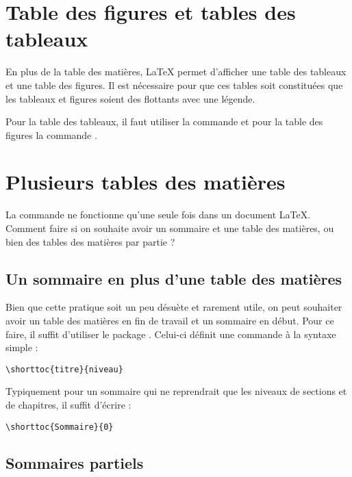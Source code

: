 \section{Table des figures et tables des tableaux}\label{tablefigure}

En plus de la table des matières, \LaTeX{} permet d'afficher une table des tableaux et une table des figures. Il est nécessaire pour que ces tables soit constituées que les tableaux et figures soient des flottants avec une légende. 

Pour la table des tableaux, il faut utiliser la commande  et pour la table des figures la commande .



\section{Plusieurs tables des matières}

La commande  ne fonctionne qu'une seule fois dans un document \LaTeX{}. Comment faire si on souhaite avoir un sommaire et une table des matières, ou bien des tables des matières par partie ?

\subsection{Un sommaire en plus d'une table des matières}

Bien que cette pratique soit un peu désuète et rarement utile, on peut souhaiter  avoir un table des matières en fin de travail et un sommaire en début.
Pour ce faire, il suffit d'utiliser le package . Celui-ci définit une commande  à la syntaxe simple :

\begin{verbatim}
\shorttoc{titre}{niveau}
\end{verbatim}

Typiquement pour un sommaire qui ne reprendrait que les niveaux de sections et de chapitres, il suffit d'écrire :

\begin{verbatim}
\shorttoc{Sommaire}{0}
\end{verbatim}




\subsection{Sommaires partiels}


